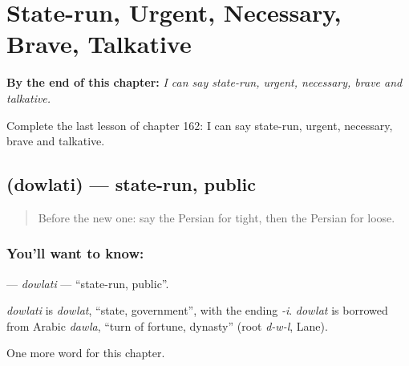 
\chapter{State-run, Urgent, Necessary, Brave, Talkative}
\label{ch:fa-state-run-urgent-necessary-brave-talkative}

\begin{chapteropening}
\textbf{By the end of this chapter:} \emph{I can say state-run, urgent, necessary, brave and talkative.}

Complete the last lesson of chapter 162: I can say state-run, urgent, necessary, brave and talkative.
\end{chapteropening}

\section[\texorpdfstring{\fa{دولتی} (dowlati)}{دولتی (dowlati)}]{ (dowlati) — state-run, public}

\label{lesson:FA-C162-dowlati}



\begin{quote}
Before the new one: say the Persian for tight, then the Persian for loose.
\end{quote}

\subsection*{You'll want to know: }
\textbf{} — \emph{dowlati} — \textquotedblleft{}state-run, public\textquotedblright{}.

\begin{cousinweb}
\emph{dowlati} is \emph{dowlat}, \textquotedblleft{}state, government\textquotedblright{}, with the ending \emph{-i}. \emph{dowlat} is borrowed from Arabic \emph{dawla}, \textquotedblleft{}turn of fortune, dynasty\textquotedblright{} (root \emph{d-w-l}, Lane).
\end{cousinweb}

\begin{grammarlens}[title={What you've built}]
One more word for this chapter.
\end{grammarlens}

